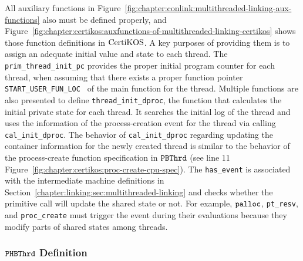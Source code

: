 All auxiliary functions in Figure~\ref{fig:chapter:conlink:multithreaded-linking-aux-functions}  also must be defined 
properly, and Figure~\ref{fig:chapter:certikos:auxfunctions-of-multithreaded-linking-certikos} shows
those function definitions in $\mathrm{CertiKOS}$. 
A key purposes of providing them is to assign an adequate initial value and state to each thread.
The \lstinline$prim_thread_init_pc$ provides the proper initial program counter for each thread, 
when assuming that there exists a proper function pointer \lstinline$START_USER_FUN_LOC $ 
of the main function for the thread.
Multiple functions are also presented to define \lstinline$thread_init_dproc$, the function that calculates the initial private state for each thread. 
It searches the initial log of the thread and
uses the information of the process-creation event  for the thread via
calling \lstinline$cal_init_dproc$.
The behavior of  \lstinline$cal_init_dproc$ regarding updating the container information for the newly created thread is similar to the behavior 
of the process-create function specification in ${{\mathrm{\texttt{PBThrd}}}}$ (see line 11
Figure~\ref{fig:chapter:certikos:proc-create-cpu-spec}).
The \lstinline$has_event$ is associated with the intermediate machine definitions in Section~\ref{chapter:linking:sec:multithreaded-linking}
and checks 
whether the primitive call will update the shared state or not.
For example, ${\mathrm{\texttt{palloc}}}$, \lstinline$pt_resv$, and \lstinline$proc_create$ must
trigger the event during their evaluations because they modify parts of shared states
among threads.



\subsubsection{${{\mathrm{\texttt{PHBThrd}}}}$ Definition}


